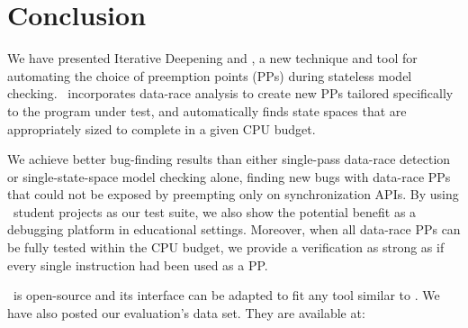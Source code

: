 \documentclass[10pt,times,numbers]{sigplanconf}
\begin{document}










\section{Conclusion}
\label{sec:conclusion}


We have presented Iterative Deepening and \quicksand, a new technique and tool for automating the choice of preemption points (PPs) during stateless model checking.
\quicksand~incorporates data-race analysis to create new PPs tailored specifically to the program under test,
and automatically finds state spaces that are appropriately sized to complete in a given CPU budget.

We achieve better bug-finding results than either single-pass data-race detection or single-state-space model checking alone,
finding new bugs with data-race PPs that could not be exposed by preempting only on synchronization APIs.
By using \numstudence~student projects as our test suite, we also show the potential benefit as a debugging platform in educational settings.
Moreover, when all data-race PPs can be fully tested within the CPU budget, we provide a verification as strong as if every single instruction had been used as a PP.

\quicksand~is open-source and its interface can be adapted to fit any tool similar to \landslide.
We have also posted our evaluation's data set. %
They are available at:
\end{document}
